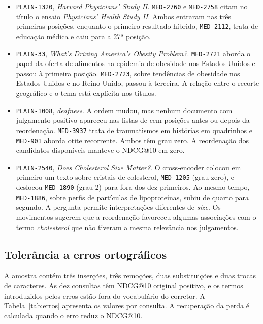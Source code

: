 \documentclass[12pt]{article}
\begin{document}
\begin{itemize}
\item \texttt{PLAIN-1320}, \textit{Harvard Physicians' Study II}.
  \texttt{MED-2760} e \texttt{MED-2758} citam no título o ensaio
  \textit{Physicians' Health Study II}. Ambos entraram nas três primeiras
  posições, enquanto o primeiro resultado híbrido, \texttt{MED-2112},
  trata de educação médica e caiu para a 27ª posição.
\item \texttt{PLAIN-33}, \textit{What's Driving America's Obesity Problem?}.
  \texttt{MED-2721} aborda o papel da oferta de alimentos na epidemia de
  obesidade nos Estados Unidos e passou à primeira posição.
  \texttt{MED-2723}, sobre tendências de obesidade nos Estados Unidos e
  no Reino Unido, passou à terceira. A relação entre o recorte geográfico
  e o tema está explícita nos títulos.
\item \texttt{PLAIN-1008}, \textit{deafness}.
  A ordem mudou, mas nenhum documento com julgamento positivo apareceu
  nas listas de cem posições antes ou depois da reordenação.
  \texttt{MED-3937} trata de traumatismos em histórias em quadrinhos e
  \texttt{MED-901} aborda otite recorrente. Ambos têm grau zero.
  A reordenação dos candidatos disponíveis manteve o NDCG@10 em zero.
\item \texttt{PLAIN-2540}, \textit{Does Cholesterol Size Matter?}.
  O cross-encoder colocou em primeiro um texto sobre cristais de
  colesterol, \texttt{MED-1205} (grau zero), e deslocou
  \texttt{MED-1890} (grau 2) para fora dos dez primeiros. Ao mesmo
  tempo, \texttt{MED-1886}, sobre perfis de partículas de lipoproteínas,
  subiu de quarto para segundo. A pergunta permite interpretações
  diferentes de \textit{size}. Os movimentos sugerem que a reordenação
  favoreceu algumas associações com o termo \textit{cholesterol} que
  não tiveram a mesma relevância nos julgamentos.
\end{itemize}

\subsection{Tolerância a erros ortográficos}

A amostra contém três inserções, três remoções, duas substituições e duas
trocas de caracteres. As dez consultas têm NDCG@10 original positivo,
e os termos introduzidos pelos erros estão fora do vocabulário do
corretor. A Tabela~\ref{tab:erros} apresenta os valores por consulta. A
recuperação da perda é calculada quando o erro reduz o NDCG@10.
\end{document}
